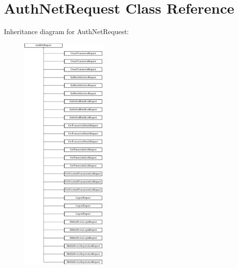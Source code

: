 \hypertarget{interface_auth_net_request}{
\section{AuthNetRequest Class Reference}
\label{interface_auth_net_request}
}
Inheritance diagram for AuthNetRequest:\begin{figure}[H]
\begin{center}
\leavevmode
\includegraphics[height=12.000000cm]{interface_auth_net_request}
\end{center}
\end{figure}
